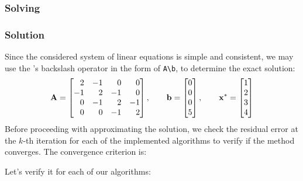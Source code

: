 \subsubsection*{Solving}



\subsubsection*{Solution}
Since the considered system of linear equations is simple and consistent, we may use the
\MATLAB's backslash operator in the form of \lstinline[style=Matlab-editor]{A\b}, to
determine the exact solution:
\begin{equation*}
  \mathbf{A} = \begin{bmatrix}
    \phantom{-}2 & -1 & \phantom{-}0 & \phantom{-}0 \\
    -1 & \phantom{-}2 & -1 & \phantom{-}0 \\
    \phantom{-}0 & -1 & \phantom{-}2 & -1 \\
    \phantom{-}0 & \phantom{-}0 & -1 & \phantom{-}2
  \end{bmatrix}, \qquad
  \mathbf{b} = \begin{bmatrix}
    0 \\
    0 \\
    0 \\
    5
  \end{bmatrix}, \qquad
  \mathbf{x}^* = \begin{bmatrix}
    1 \\
    2 \\
    3 \\
    4
  \end{bmatrix}
\end{equation*}
Before proceeding with approximating the solution, we check the residual error
at the $k$-th iteration for each of the implemented algorithms to verify if the method
converges. The convergence criterion is:

Let's verify it for each of our algorithms:


